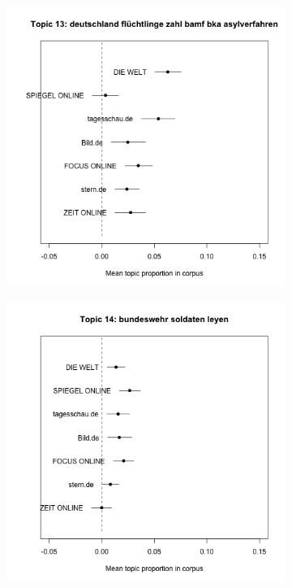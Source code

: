 \documentclass[12pt,a4paper,notitlepage]{article}
\begin{document}
\begin{figure}[H]
\begin{center}
\begin{subfigure}[normla]{0.2\textwidth}
		\end{subfigure}
		\begin{subfigure}[normla]{0.2\textwidth}
			\includegraphics[width=\textwidth]{../figs/estimate_effect13.png}
		\end{subfigure}
		\begin{subfigure}[normla]{0.2\textwidth}
			\includegraphics[width=\textwidth]{../figs/estimate_effect14.png}
		\end{subfigure}
	\end{center}
	\label{fig_estimateEffects_full1}
\end{figure}
\end{document}
